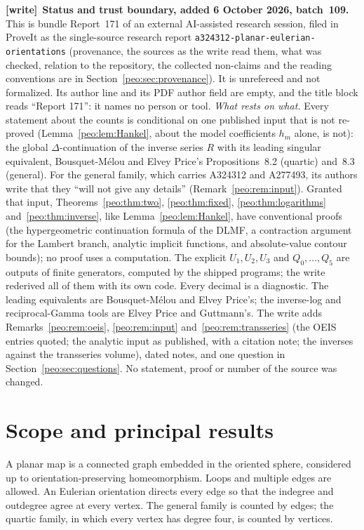 \documentclass[11pt]{article}
\numberwithin{equation}{section}
\theoremstyle{remark}\newtheorem{remark}[theorem]{Remark}
\newcommand{\file}[1]{\nolinkurl{#1}}
\newenvironment{writenote}[1][]{\par\smallskip\begingroup\small
 \noindent\textbf{[write]}\if\relax\detokenize{#1}\relax\else~\textbf{#1.}\fi\ }%
 {\par\endgroup\smallskip}
\begin{document}
\begin{writenote}[Status and trust boundary, added 6 October 2026, batch~109]
This is bundle Report~171 of an external AI-assisted research session,
filed in ProveIt as the single-source research report
\file{a324312-planar-eulerian-orientations} (provenance, the sources as the
write read them, what was checked, relation to the repository, the
collected non-claims and the reading conventions are in
Section~\ref{peo:sec:provenance}). It is unrefereed and not formalized. Its
author line and its PDF author field are empty, and the title block reads
``Report 171'': it names no person or tool. \emph{What rests on what.}
Every statement about the counts is conditional on one published input
that is not re-proved (Lemma~\ref{peo:lem:Hankel}, about the model
coefficients $h_m$ alone, is not): the global $\Delta$-continuation of the inverse series $R$ with
its leading singular equivalent, Bousquet-M\'elou and Elvey Price's
Propositions~8.2 (quartic) and~8.3 (general). For the general family, which
carries A324312 and A277493, its authors write that they ``will not give any
details'' (Remark~\ref{peo:rem:input}). Granted that input,
Theorems~\ref{peo:thm:two}, \ref{peo:thm:fixed}, \ref{peo:thm:logarithms}
and~\ref{peo:thm:inverse}, like Lemma~\ref{peo:lem:Hankel}, have
conventional proofs (the hypergeometric continuation formula of the DLMF, a contraction
argument for the Lambert branch, analytic implicit functions, and
absolute-value contour bounds); no proof uses a computation. The explicit
$U_1,U_2,U_3$ and $Q_0,\dots,Q_5$ are outputs of finite generators, computed
by the shipped programs; the write rederived all of them with its own code.
Every decimal is a diagnostic. The leading equivalents are Bousquet-M\'elou
and Elvey Price's; the inverse-log and reciprocal-Gamma tools are Elvey Price
and Guttmann's. The write adds Remarks~\ref{peo:rem:oeis},
\ref{peo:rem:input} and~\ref{peo:rem:transseries} (the OEIS entries quoted;
the analytic input as published, with a citation note; the inverses against
the transseries volume), dated notes, and one question in
Section~\ref{peo:sec:questions}. No statement, proof or number of the source
was changed.
\end{writenote}
\tableofcontents

\section{Scope and principal results}\label{peo:sec:scope}
A planar map is a connected graph embedded in the oriented sphere, considered up to orientation-preserving homeomorphism. Loops and multiple edges are allowed. An Eulerian orientation directs every edge so that the indegree and outdegree agree at every vertex. The general family is counted by edges; the quartic family, in which every vertex has degree four, is counted by vertices.
\end{document}
